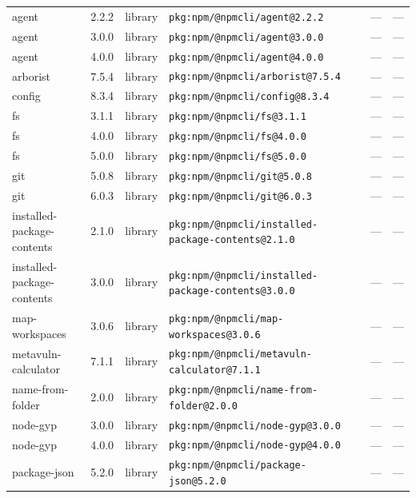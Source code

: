 \documentclass[11pt,a4paper]{article}
\begin{document}
\begin{longtable}{|p{4cm}|p{2cm}|p{1.6cm}|p{5cm}|p{1.5cm}|p{3.5cm}|}
\raggedright agent & 2.2.2 & library & \small\texttt{pkg:npm/@npmcli/agent@2.2.2} & — & \small — \\
\raggedright agent & 3.0.0 & library & \small\texttt{pkg:npm/@npmcli/agent@3.0.0} & — & \small — \\
\raggedright agent & 4.0.0 & library & \small\texttt{pkg:npm/@npmcli/agent@4.0.0} & — & \small — \\
\raggedright arborist & 7.5.4 & library & \small\texttt{pkg:npm/@npmcli/arborist@7.5.4} & — & \small — \\
\raggedright config & 8.3.4 & library & \small\texttt{pkg:npm/@npmcli/config@8.3.4} & — & \small — \\
\raggedright fs & 3.1.1 & library & \small\texttt{pkg:npm/@npmcli/fs@3.1.1} & — & \small — \\
\raggedright fs & 4.0.0 & library & \small\texttt{pkg:npm/@npmcli/fs@4.0.0} & — & \small — \\
\raggedright fs & 5.0.0 & library & \small\texttt{pkg:npm/@npmcli/fs@5.0.0} & — & \small — \\
\raggedright git & 5.0.8 & library & \small\texttt{pkg:npm/@npmcli/git@5.0.8} & — & \small — \\
\raggedright git & 6.0.3 & library & \small\texttt{pkg:npm/@npmcli/git@6.0.3} & — & \small — \\
\raggedright installed-package-contents & 2.1.0 & library & \small\texttt{pkg:npm/@npmcli/installed-package-contents@2.1.0} & — & \small — \\
\raggedright installed-package-contents & 3.0.0 & library & \small\texttt{pkg:npm/@npmcli/installed-package-contents@3.0.0} & — & \small — \\
\raggedright map-workspaces & 3.0.6 & library & \small\texttt{pkg:npm/@npmcli/map-workspaces@3.0.6} & — & \small — \\
\raggedright metavuln-calculator & 7.1.1 & library & \small\texttt{pkg:npm/@npmcli/metavuln-calculator@7.1.1} & — & \small — \\
\raggedright name-from-folder & 2.0.0 & library & \small\texttt{pkg:npm/@npmcli/name-from-folder@2.0.0} & — & \small — \\
\raggedright node-gyp & 3.0.0 & library & \small\texttt{pkg:npm/@npmcli/node-gyp@3.0.0} & — & \small — \\
\raggedright node-gyp & 4.0.0 & library & \small\texttt{pkg:npm/@npmcli/node-gyp@4.0.0} & — & \small — \\
\raggedright package-json & 5.2.0 & library & \small\texttt{pkg:npm/@npmcli/package-json@5.2.0} & — & \small — \\

\end{longtable}
\end{document}
